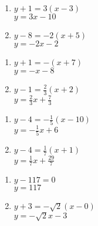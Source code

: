 \documentclass{ximera}
\begin{document}
\begin{multicols}{2}
\begin{enumerate}

\item $y+1 = 3(x-3)$ \\ $y = 3x-10$
\item $y-8 = -2(x+5)$ \\ $y = -2x-2$

\setcounter{HW}{\value{enumi}}
\end{enumerate}
\end{multicols}

\begin{multicols}{2}
\begin{enumerate}
\setcounter{enumi}{\value{HW}}

\item $y + 1 = -(x+7)$ \\ $y = -x-8$
\item $y - 1 = \frac{2}{3} (x+2)$ \\ $y = \frac{2}{3} x + \frac{7}{3}$

\setcounter{HW}{\value{enumi}}
\end{enumerate}
\end{multicols}

\begin{multicols}{2}
\begin{enumerate}
\setcounter{enumi}{\value{HW}}

\item $y - 4 = -\frac{1}{5} (x-10)$ \\ $y = -\frac{1}{5} x + 6$
\item $y - 4 = \frac{1}{7}(x + 1)$ \\ $y = \frac{1}{7}x + \frac{29}{7}$


\setcounter{HW}{\value{enumi}}
\end{enumerate}
\end{multicols}

\begin{multicols}{2}
\begin{enumerate}
\setcounter{enumi}{\value{HW}}

\item $y - 117 = 0$ \\ $y = 117$
\item $y + 3 = -\sqrt{2}(x - 0)$ \\ $y = -\sqrt{2}x - 3$

\setcounter{HW}{\value{enumi}}
\end{enumerate}
\end{multicols}
\end{document}
